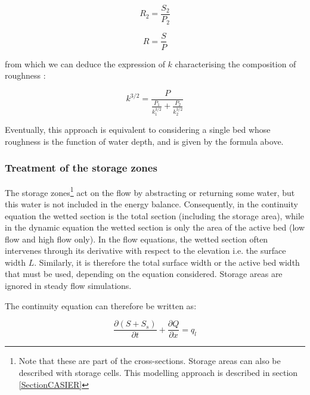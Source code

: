 \begin{equation}
  R_2 = \frac{S_2}{P_2}
\end{equation}

\begin{equation}
  R = \frac{S}{P}
\end{equation}

\vspace{0.5cm}

from which we can deduce the expression of $k$ characterising the composition of roughness :

\begin{equation}
  k^{3/2} = \frac{P}{\displaystyle \frac{P_1}{k_{1}^{3/2}}+\frac{P_2}{k_{2}^{3/2}}}
\end{equation}

\vspace{0.5cm}

Eventually, this approach is equivalent to considering a single bed whose roughness is the function of water depth, and is given by the formula above.

\subsubsection{Treatment of the storage zones}

The storage zones\footnote{Note that these are part of the cross-sections. Storage areas can also be described with storage cells. This modelling approach is described in section \ref{SectionCASIER}} 
act on the flow by abstracting or returning some water, but this water is not included in the energy balance. Consequently, in the continuity equation the wetted section is the total section (including the storage area), while in the dynamic equation the wetted section is only the area of the active bed (low flow and high flow only). In the flow equations, the wetted section often intervenes through its derivative with respect to the elevation i.e. the surface width $L$. Similarly, it is therefore the total surface width or the active bed width that must be used, depending on the equation considered. 
Storage areas are ignored in steady flow simulations.

\vspace{0.5cm}

The continuity equation can therefore be written as:

\begin{equation}
  \frac{\partial{(S + S_s)}}{\partial t} + \frac{\partial Q}{\partial x} = q_l
\end{equation}

